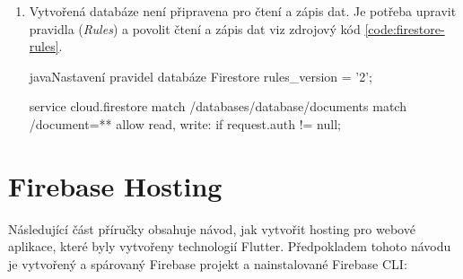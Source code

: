 \documentclass[czech, bc, kiv, he, iso690numb]{fasthesis}
\begin{document}
\begin{enumerate}[label=\arabic*.]
\item Vytvořená databáze není připravena pro čtení a zápis dat. Je potřeba upravit pravidla (\textit{Rules}) a povolit čtení a zápis dat viz zdrojový kód \ref{code:firestore-rules}. 

\begin{code}{java}{Nastavení pravidel databáze Firestore \label{code:firestore-rules}}
rules_version = '2';

service cloud.firestore {
  match /databases/{database}/documents {
    match /{document=**} {
      allow read, write: if request.auth != null;
    }
  }
}
\end{code}

\end{enumerate}

\section{Firebase Hosting}

Následující část příručky obsahuje návod, jak vytvořit hosting pro webové aplikace, které byly vytvořeny technologií Flutter. Předpokladem tohoto návodu je vytvořený a spárovaný Firebase projekt a nainstalované Firebase \gls{CLI}:
\end{document}
